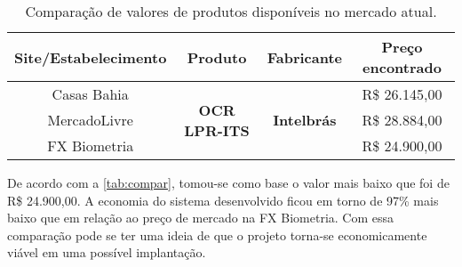 \begin{table}[htb]
	\ABNTEXfontereduzida
	\caption[\footnotesize Comparação de valores.]{\footnotesize Comparação de valores de produtos disponíveis no mercado atual.}
	\label{tab:compar}
	\centering
	\begin{tabular}{c|c|c|c}
		\hline
		\textbf{Site/Estabelecimento} & \textbf{Produto} & \textbf{Fabricante} & \textbf{Preço encontrado} \\
		\hline \hline
		Casas Bahia & \multirow{3}{*}{\textbf{OCR LPR-ITS}} & \multirow{3}{*}{\textbf{Intelbrás}} & R\$ 26.145,00 \\
 		\cline{1-1} 
 		\cline{4-4}
 		MercadoLivre & & & R\$ 28.884,00 \\
 		\cline{1-1} 
 		\cline{4-4}
 		FX Biometria & & & R\$ 24.900,00 \\
		\hline \hline
	\end{tabular}
\end{table} 

De acordo com a \autoref{tab:compar}, tomou-se como base o valor mais baixo que foi de R\$ 24.900,00. A economia do sistema desenvolvido ficou em torno de 97\% mais baixo que em relação ao preço de mercado na FX Biometria. Com essa comparação pode se ter uma ideia de que o projeto torna-se economicamente viável em uma possível implantação. 